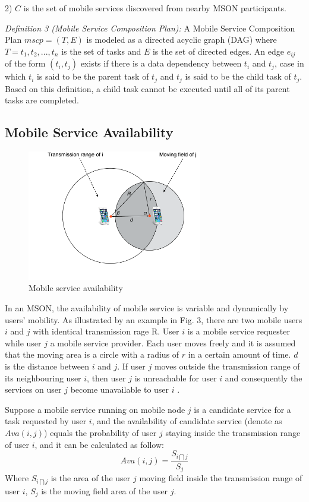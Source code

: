 \documentclass[10pt,journal,compsoc]{IEEEtran}
\begin{document}
​2) $C$ is the set of mobile services discovered from nearby MSON participants.

\textit{Definition 3 (Mobile Service Composition Plan):} A Mobile Service Composition Plan $mscp = (T, E)$ is modeled as a directed acyclic graph (DAG) where $T = {t_1, t_2, ..., t_n}$ is the set of tasks and $E$ is the set of directed edges. An edge $e_{ij}$ of the form $(t_i,t_j)$ exists if there is a data dependency between $t_i$
and $t_j$, case in which $t_i$ is said to be the parent task of $t_j$ and $t_j$ is said to be the child task of $t_j$. Based on this definition, a child task cannot be executed until all of its parent tasks are completed.

\subsection{Mobile Service Availability}
\begin{figure}[!t]
\centering
\includegraphics[width=3in]{./img/pic3.pdf}
\caption{Mobile service availability}
\label{fig_sd}
\end{figure}
In an MSON, the availability of mobile service is variable and dynamically by users' mobility. 
As illustrated by an example in Fig. 3, there are two mobile users $i$ and $j$ with identical transmission rage R. User $i$ is a mobile service requester while user $j$ a mobile service provider. Each user moves freely and it is assumed that the moving area is a circle with a radius of $r$ in a certain amount of time. $d$ is the distance between $i$ and $j$. If user $j$ moves outside the transmission range of its neighbouring user $i$, then user $j$ is unreachable for user $i$ and consequently the services on user $j$ become unavailable to user $i$ \cite{Yang2010}.

Suppose a mobile service running on mobile node $j$ is a candidate service for a task requested by user $i$, and the availability of candidate service (denote as $Ava(i,j)$) equals the probability of user $j$ staying inside the transmission range of user $i$, and it can be calculated as follow: 
\begin{equation}
Ava(i,j) = \frac{S_{i \bigcap j}}{S_j}
\end{equation}
Where $S_{i \bigcap j}$ is the area of the user $j$ moving field inside the transmission range of user $i$, $S_j$ is the moving field area of the user $j$.
\end{document}

